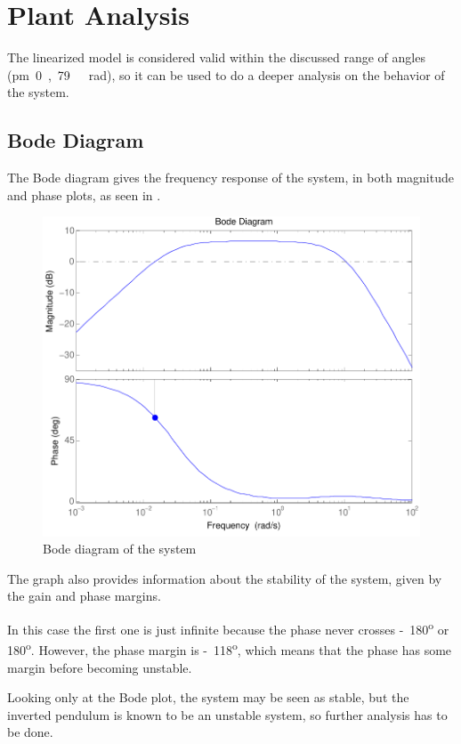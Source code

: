 \section{Plant Analysis}
The linearized model is considered valid within the discussed range of angles (\si{\pm 0,79\ rad}), so it can be used to do a deeper analysis on the behavior of the system. %

\subsection{Bode Diagram}
The Bode diagram gives the frequency response of the system, in both magnitude and phase plots, as seen in .
\begin{figure}[H] 
	\centering 
	\includegraphics[scale=0.65]{figures/bodeTF}
	\caption{Bode diagram of the system}
	\label{bodeTF}
\end{figure} 

The graph also provides information about the stability of the system, given by the gain and phase margins. 

In this case the first one is just infinite because the phase never crosses \si{-180^o} or \si{180^o}. However, the phase margin is \si{-118^o}, which means that the phase has some margin before becoming unstable.

Looking only at the Bode plot, the system may be seen as stable, but the inverted pendulum is known to be an unstable system, so further analysis has to be done.


